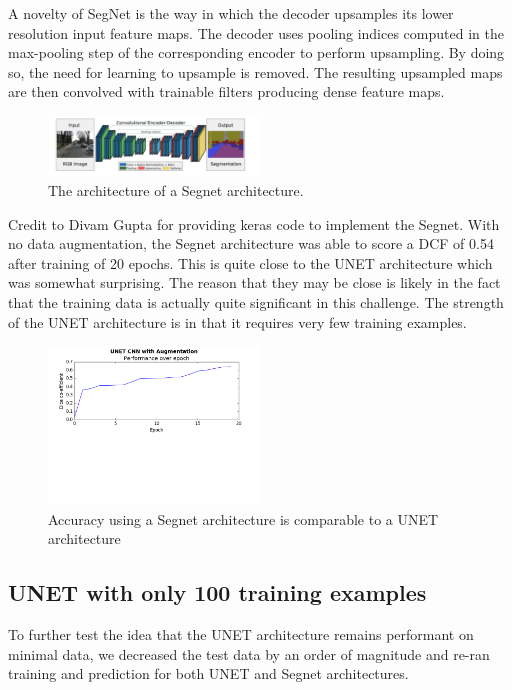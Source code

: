 \documentclass[letterpaper]{article}
\begin{document}
A novelty of SegNet  is the way in which the decoder upsamples its lower resolution input feature maps. The decoder uses pooling indices computed in the max-pooling step of the corresponding encoder to perform upsampling. By doing so, the need for learning to upsample is removed. The resulting upsampled maps are then convolved with trainable filters producing dense feature maps. 

 \begin{figure}[H]
  \centerline{\includegraphics[width=0.5\textwidth]{Images/SegNetArchitecture.png}}
  \caption{The architecture of a Segnet architecture.}
  \label{fig:segnet}
\end{figure}


Credit to Divam Gupta for providing keras code to implement the Segnet. \cite{segnetimplementation}With no data augmentation, the Segnet architecture was able to score a DCF of 0.54 after training of 20 epochs. This is quite close to the UNET architecture which was somewhat surprising. The reason that they may be close is likely in the fact that the training data is actually quite significant in this challenge. The strength of the UNET architecture is in that it requires very few training examples.


 \begin{figure}[H]
  \centerline{\includegraphics[width=0.5\textwidth]{Plots/SegNet.png}}
  \caption{Accuracy using a Segnet architecture is comparable to a UNET architecture}
  \label{fig:trainingovertime2.}
\end{figure}

\subsection{UNET with only 100 training examples}
To further test the idea that the UNET architecture remains performant on minimal data, we decreased the test data by an order of magnitude and re-ran training and prediction for both UNET and Segnet architectures. 
\end{document}
